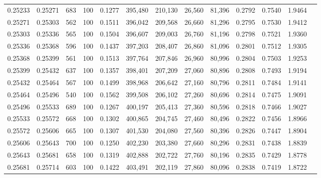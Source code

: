 \begin{tabular}{rrrrrrrrrrrrr}
0.25233 & 0.25271 &   683 & 100 &                                     0.1277 & 395,480 & 210,130 &  26,560 &  81,396 & 0.2792 & 0.7540 & 1.9464 \\
0.25271 & 0.25303 &   562 & 100 &                                     0.1511 & 396,042 & 209,568 &  26,660 &  81,296 & 0.2795 & 0.7530 & 1.9412 \\
0.25303 & 0.25336 &   565 & 100 &                                     0.1504 & 396,607 & 209,003 &  26,760 &  81,196 & 0.2798 & 0.7521 & 1.9360 \\
0.25336 & 0.25368 &   596 & 100 &                                     0.1437 & 397,203 & 208,407 &  26,860 &  81,096 & 0.2801 & 0.7512 & 1.9305 \\
0.25368 & 0.25399 &   561 & 100 &                                     0.1513 & 397,764 & 207,846 &  26,960 &  80,996 & 0.2804 & 0.7503 & 1.9253 \\
0.25399 & 0.25432 &   637 & 100 &                                     0.1357 & 398,401 & 207,209 &  27,060 &  80,896 & 0.2808 & 0.7493 & 1.9194 \\
0.25432 & 0.25464 &   567 & 100 &                                     0.1499 & 398,968 & 206,642 &  27,160 &  80,796 & 0.2811 & 0.7484 & 1.9141 \\
0.25464 & 0.25496 &   540 & 100 &                                     0.1562 & 399,508 & 206,102 &  27,260 &  80,696 & 0.2814 & 0.7475 & 1.9091 \\
0.25496 & 0.25533 &   689 & 100 &                                     0.1267 & 400,197 & 205,413 &  27,360 &  80,596 & 0.2818 & 0.7466 & 1.9027 \\
0.25533 & 0.25572 &   668 & 100 &                                     0.1302 & 400,865 & 204,745 &  27,460 &  80,496 & 0.2822 & 0.7456 & 1.8966 \\
0.25572 & 0.25606 &   665 & 100 &                                     0.1307 & 401,530 & 204,080 &  27,560 &  80,396 & 0.2826 & 0.7447 & 1.8904 \\
0.25606 & 0.25643 &   700 & 100 &                                     0.1250 & 402,230 & 203,380 &  27,660 &  80,296 & 0.2831 & 0.7438 & 1.8839 \\
0.25643 & 0.25681 &   658 & 100 &                                     0.1319 & 402,888 & 202,722 &  27,760 &  80,196 & 0.2835 & 0.7429 & 1.8778 \\
0.25681 & 0.25714 &   603 & 100 &                                     0.1422 & 403,491 & 202,119 &  27,860 &  80,096 & 0.2838 & 0.7419 & 1.8722 \\

\end{tabular}
